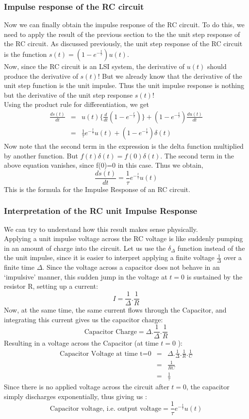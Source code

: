 \subsubsection{Impulse response of the RC circuit}
Now we can finally obtain the impulse response of the RC circuit. To do this, we need to apply the result of the previous section to the the unit step response of the RC circuit. As discussed previously, the unit step response of the RC circuit is the function $s(t)=(1-e^{-\frac{t}{\tau}})u(t)$.\\
\indent Now, since the RC circuit is an LSI system, the derivative of $u(t)$ should produce the derivative of $s(t)$! But we already know that the derivative of the unit step function is the unit impulse. Thus the unit impulse response is nothing but the derivative of the unit step response $s(t)$!\\
Using the product rule for differentiation, we get
\begin{eqnarray*}
\frac{ds(t)}{dt} &=& u(t)\Big\{\frac{d}{dt}(1-e^{-\frac{t}{\tau}})\Big\} + (1-e^{-\frac{t}{\tau}})\frac{du(t)}{dt}\\
&=& \frac{1}{\tau}e^{-\frac{t}{\tau}}u(t)+(1-e^{-\frac{t}{\tau}})\delta(t)
\end{eqnarray*}
\indent Now note that the second term in the expression is the delta function multiplied by another function. But $f(t)\delta(t)=f(0)\delta(t)$. The second term in the above equation vanishes, since f(0)=0 in this case. Thus we obtain,
$$\frac{ds(t)}{dt}=\frac{1}{\tau}e^{-\frac{t}{\tau}}u(t)$$
This is the formula for the Impulse Response of an RC circuit.
\subsubsection{Interpretation of the RC unit Impulse Response}
We can try to understand how this result makes sense physically.\\
\indent Applying a unit impulse voltage across the RC voltage is like suddenly pumping in an amount of charge into the circuit. Let us use the $\delta_\Delta$ function instead of the the unit impulse, since it is easier to interpret applying a finite voltage $\frac{1}{\Delta}$ over a finite time $\Delta$. Since the voltage across a capacitor does not behave in an `impulsive' manner, this sudden jump in the voltage at $t=0$ is sustained by the resistor R, setting up a current:
$$I=\frac{1}{\Delta}.\frac{1}{R}$$
Now, at the same time, the same current flows through the Capacitor, and integrating this current gives us the capacitor charge:
$$\textrm{Capacitor Charge}=\Delta .\frac{1}{\Delta} .\frac{1}{R}$$
Resulting in a voltage across the Capacitor (at time $t=0$ ):
\begin{eqnarray*}
\textrm{Capacitor Voltage at time t=0}&=&\Delta .\frac{1}{\Delta} .\frac{1}{R} .\frac{1}{C} \\
&=&\frac{1}{RC}\\
&=& \frac{1}{\tau}
\end{eqnarray*}
\indent Since there is no applied voltage across the circuit after $t=0$, the capacitor simply discharges exponentially, thus giving us :
\[
\textrm{Capacitor voltage, i.e. output voltage}=\frac{1}{\tau}e^{-\frac{t}{\tau}}u(t) 
\]
	